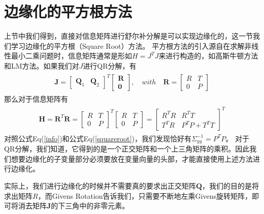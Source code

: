 \documentclass[a4pape,oneside,10pt]{article}
\begin{document}
\section{边缘化的平方根方法}
上节中我们得到，直接对信息矩阵进行舒尔补分解是可以实现边缘化的，这一节我们学习边缘化的平方根（Square Root）方法。
平方根方法的引入源自在求解非线性最小二乘问题时，信息矩阵通常是形如$H=J^TJ$来进行构造的，如高斯牛顿方法和LM方法。如果我们对$J$进行QR分解，有
\begin{equation}
    \label{qr}
    \begin{split}
    \begin{aligned}
        \textbf{J} = \begin{bmatrix}
            \textbf{Q}_1 & \textbf{Q}_2
        \end{bmatrix} ^T
        \begin{bmatrix}
            \textbf{R} \\ \textbf{0}
        \end{bmatrix},  
        \quad with \quad \textbf{R} = \begin{bmatrix}
            R & T \\
            0 & P
        \end{bmatrix}
    \end{aligned}
    \end{split}
    \end{equation}
那么对于信息矩阵有
\begin{equation}
    \label{squareroot}
    \begin{split}
    \begin{aligned}
        \textbf{H} = \textbf{R}^T\textbf{R} = 
        \begin{bmatrix}
            R & T \\
            0 & P
        \end{bmatrix} ^T
        \begin{bmatrix}
            R & T \\
            0 & P
        \end{bmatrix}
        =
        \begin{bmatrix}
            R^TR & R^TT \\
            T^TR & P^TP + T^TT
        \end{bmatrix} ^T
    \end{aligned}
    \end{split}
\end{equation}
对照公式Eq(\ref{info})和公式Eq(\ref{squareroot})，我们发现恰好有$\Sigma_{yy}^{-1} = P^TP$。
对于QR分解，我们知道，它得到的是一个正交矩阵和一个上三角矩阵的乘积。因此我们想要边缘化的子变量部分必须要放在变量向量的头部，才能直接使用上述方法进行边缘化。

实际上，我们进行边缘化的时候并不需要真的要求出正交矩阵$\textbf{Q}$，我们的目的是将求出矩阵$R$，而Givens Rotation告诉我们，只需要不断地左乘Givens旋转矩阵，即可将消去矩阵$\textbf{J}$的下三角中的非零元素。
\end{document}
